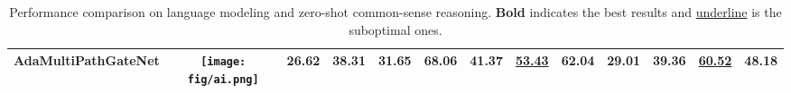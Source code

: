 \begin{table*}[t!]
\begin{tabular}{l|c|cc|ccccccccc}
\hspace{2mm} AdaMultiPathGateNet & \texttt{[image: fig/ai.png]} & 26.62 & 38.31 & 31.65 & 68.06 & 41.37 & \underline{53.43} & 62.04 & 29.01 & 39.36 & \underline{60.52} & 48.18 \\
    \bottomrule
    \end{tabular}
    \addtolength{\tabcolsep}{2.5pt}    
    \centering
    \caption{
    Performance comparison on language modeling and zero-shot common-sense reasoning. \textbf{Bold} indicates the best results and \underline{underline} is the suboptimal ones.
    }
    \label{tab:model_comparison}
    \vspace{-4mm}
    \end{table*} 